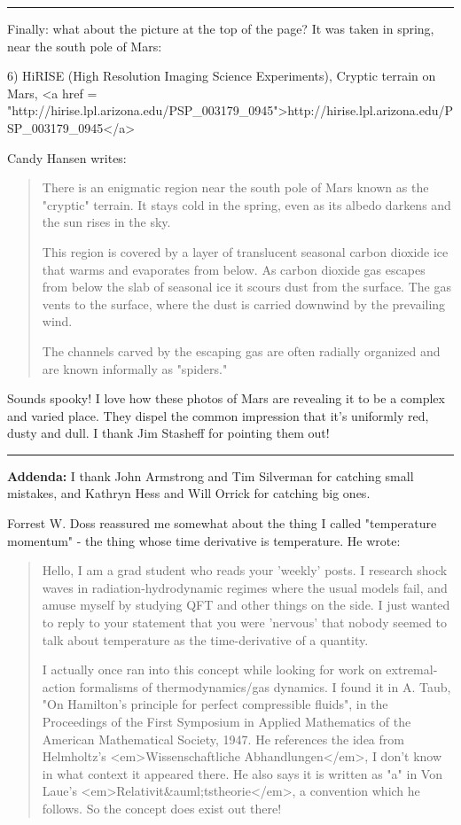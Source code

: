 \par\noindent\rule{\textwidth}{0.4pt}

Finally: what about the picture at the top of the page?  It was taken
in spring, near the south pole of Mars:

6) HiRISE (High Resolution Imaging Science Experiments), Cryptic
terrain on Mars, <a href = "http://hirise.lpl.arizona.edu/PSP_003179_0945">http://hirise.lpl.arizona.edu/PSP_003179_0945</a>

Candy Hansen writes:

\begin{quote}
  There is an enigmatic region near the south pole of Mars known as
  the "cryptic" terrain. It stays cold in the spring, even as its
  albedo darkens and the sun rises in the sky.

  This region is covered by a layer of translucent seasonal carbon
  dioxide ice that warms and evaporates from below. As carbon dioxide
  gas escapes from below the slab of seasonal ice it scours dust from
  the surface. The gas vents to the surface, where the dust is carried
  downwind by the prevailing wind.

  The channels carved by the escaping gas are often radially organized
  and are known informally as "spiders."
\end{quote}
    

Sounds spooky!  I love how these photos of Mars are revealing it to be
a complex and varied place.  They dispel the common impression that
it's uniformly red, dusty and dull.  I thank Jim Stasheff for pointing
them out!

\par\noindent\rule{\textwidth}{0.4pt}

\textbf{Addenda:} 
I thank John Armstrong and Tim Silverman for catching small
mistakes, and Kathryn Hess and Will Orrick for catching big ones.

Forrest W. Doss reassured me somewhat about the thing I
called "temperature momentum" - the thing whose time
derivative is temperature.  He wrote:

\begin{quote}
Hello, I am a grad student who reads your 'weekly' posts.  I research
shock waves in radiation-hydrodynamic regimes where the usual models
fail, and amuse myself by studying QFT and other things on the side.
I just wanted to reply to your statement that you were 'nervous' that
nobody seemed to talk about temperature as the time-derivative of a
quantity.

I actually once ran into this concept while looking for work on
extremal-action formalisms of thermodynamics/gas dynamics.  I found it
in A. Taub, "On Hamilton's principle for perfect compressible fluids",
in the Proceedings of the First Symposium in Applied Mathematics of
the American Mathematical Society, 1947.  He references the idea from
Helmholtz's <em>Wissenschaftliche Abhandlungen</em>, I don't know in
what context it appeared there. He also says it is written as "a" in
Von Laue's <em>Relativit&auml;tstheorie</em>, a convention which he
follows.  So the concept does exist out there!  
\end{quote}
    

